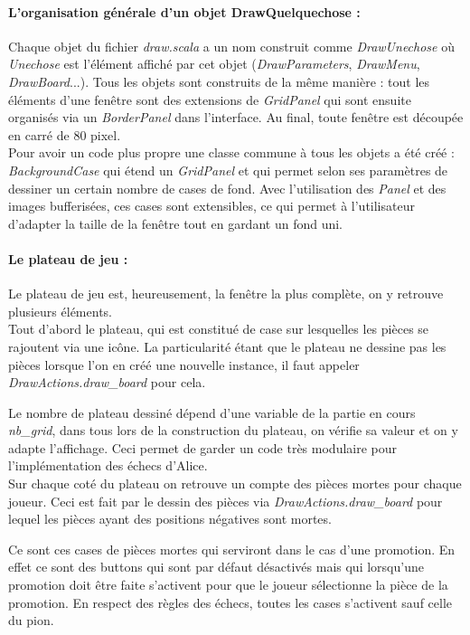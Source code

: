 \documentclass[a4paper]{article}
\begin{document}
\paragraph{L'organisation générale d'un objet DrawQuelquechose :}Chaque objet du fichier \textit{draw.scala} a un nom construit comme \textit{DrawUnechose} où \textit{Unechose} est l'élément affiché par cet objet (\textit{DrawParameters}, \textit{DrawMenu}, \textit{DrawBoard}...). Tous les objets sont construits de la même manière : tout les éléments d'une fenêtre sont des extensions de \textit{GridPanel} qui sont ensuite organisés via un \textit{BorderPanel} dans l'interface. Au final, toute fenêtre est découpée en carré de 80 pixel. \\

Pour avoir un code plus propre une classe commune à tous les objets a été créé : \textit{BackgroundCase} qui étend un \textit{GridPanel} et qui permet selon ses paramètres de dessiner un certain nombre de cases de fond. Avec l'utilisation des \textit{Panel} et des images bufferisées, ces cases sont extensibles, ce qui permet à l'utilisateur d'adapter la taille de la fenêtre tout en gardant un fond uni.

\paragraph{Le plateau de jeu :}Le plateau de jeu est, heureusement, la fenêtre la plus complète, on y retrouve plusieurs éléments. \\

Tout d'abord le plateau, qui est constitué de case sur lesquelles les pièces se rajoutent via une icône. La particularité étant que le plateau ne dessine pas les pièces lorsque l'on en créé une nouvelle instance, il faut appeler \textit{DrawActions.draw\_board} pour cela. 

Le nombre de plateau dessiné dépend d'une variable de la partie en cours \textit{nb\_grid}, dans tous lors de la construction du plateau, on vérifie sa valeur et on y adapte l'affichage. Ceci permet de garder un code très modulaire pour l'implémentation des échecs d'Alice. \\

Sur chaque coté du plateau on retrouve un compte des pièces mortes pour chaque joueur. Ceci est fait par le dessin des pièces via \textit{DrawActions.draw\_board} pour lequel les pièces ayant des positions négatives sont mortes.

Ce sont ces cases de pièces mortes qui serviront dans le cas d'une promotion. En effet ce sont des buttons qui sont par défaut désactivés mais qui lorsqu'une promotion doit être faite s'activent pour que le joueur sélectionne la pièce de la promotion. En respect des règles des échecs, toutes les cases s'activent sauf celle du pion. \\
\end{document}
